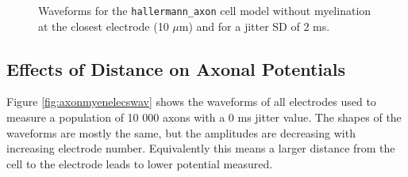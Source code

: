 \documentclass[final, a4paper,masters,en,listoffigures,listoftables,norwegiandates]{NMBU}
\begin{document}
\begin{figure}[htbp]
    \centering
    \caption{Waveforms for the \texttt{hallermann\_axon} cell model without myelination at the closest electrode (10 $\mu$m) and for a jitter SD of 2 ms.} 
    \label{fig:axonwavunmyen}
\end{figure}

\subsection{Effects of Distance on Axonal Potentials}
Figure \ref{fig:axonmyenelecswav} shows the waveforms of all electrodes used to measure a population of 10 000 axons with a 0 ms jitter value. The shapes of the waveforms are mostly the same, but the amplitudes are decreasing with increasing electrode number. Equivalently this means a larger distance from the cell to the electrode leads to lower potential measured. 
\end{document}
